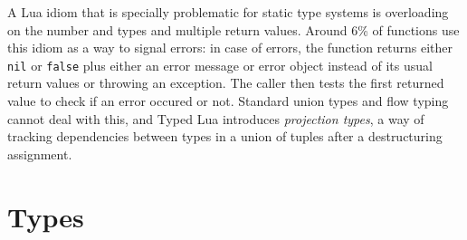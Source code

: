 \documentclass[preprint]{sigplanconf}
\begin{document}
A Lua idiom that is specially problematic for static type
systems is overloading on the number and types and
multiple return values. Around 6\% of functions use
this idiom as a way to signal errors: in case of errors,
the function returns either {\tt nil} or {\tt false} plus
either an error message or error object instead of its usual
return values or throwing an exception. The caller then
tests the first returned value to check if an error occured
or not. Standard union types and flow typing cannot deal
with this, and Typed Lua introduces {\em projection types},
a way of tracking dependencies between types in a union of
tuples after a destructuring assignment.

\section{Types}
\label{sec:types}
\end{document}
